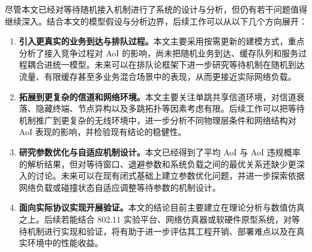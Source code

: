 尽管本文已经对等待随机接入机制进行了系统的设计与分析，但仍有若干问题值得继续深入。结合本文的模型假设与分析边界，后续工作可以从以下几个方向展开：
\begin{enumerate}[wide]
    \item \textbf{引入更真实的业务到达与排队过程。}本文主要采用按需更新的建模方式，重点分析了接入竞争过程对 AoI 的影响，尚未把随机业务到达、缓存队列和服务过程耦合进统一模型。未来可以在排队论框架下进一步研究等待机制在随机到达流量、有限缓存甚至多业务混合场景中的表现，从而更接近实际网络负载。

    \item \textbf{拓展到更复杂的信道和网络环境。}本文主要关注单跳共享信道环境，对信道衰落、隐藏终端、节点异构以及多跳拓扑等因素考虑有限。后续工作可以把等待机制推广到更复杂的无线环境中，进一步分析不同物理层条件和网络结构对 AoI 表现的影响，并检验现有结论的稳健性。

    \item \textbf{研究参数优化与自适应机制设计。}本文已经得到了平均 AoI 与 AoI 违规概率的解析结果，但对等待窗口、退避参数和系统负载之间的最优关系还缺少更深入的讨论。未来可以在现有闭式基础上建立参数优化问题，并进一步探索依据网络负载或碰撞状态自适应调整等待参数的机制设计。

    \item \textbf{面向实际协议实现开展验证。}本文的结论目前主要建立在理论分析与数值仿真之上。后续若能结合 802.11 实验平台、网络仿真器或软硬件原型系统，对等待机制进行实现和验证，将有助于进一步评估其工程开销、部署难点以及在真实环境中的性能收益。
\end{enumerate}
